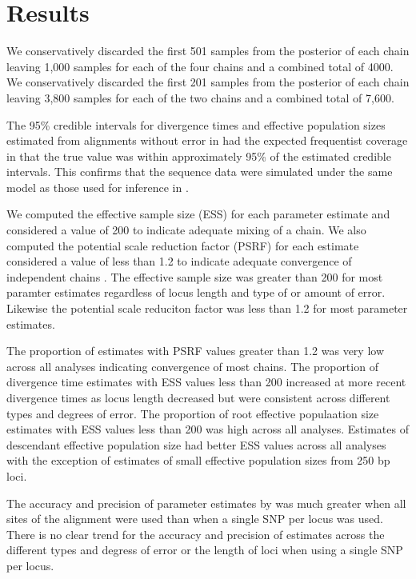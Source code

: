 \section{Results}

We conservatively discarded the first 501 samples from the posterior of each 
\ecoevolity chain leaving 1,000 samples for each of the four chains and a combined
total of 4000.
We conservatively discarded the first 201 samples from the posterior of each 
\beast chain leaving 3,800 samples for each of the two chains and a combined
total of 7,600.

The 95\% credible intervals for divergence times and effective population 
sizes estimated from alignments without error in \beast had the expected 
frequentist coverage in that the true value was within approximately 95\% of the 
estimated credible intervals. 
This confirms that the sequence data were simulated under the same model as 
those used for inference in \beast. 

We computed the effective sample size (ESS) for each parameter estimate and considered
a value of 200 to indicate adequate mixing of a chain. 
We also computed the potential scale reduction factor (PSRF) for each estimate 
considered a value of less than 1.2 to indicate adequate convergence of 
independent chains \citep{gelman1998}. 
The effective sample size was greater than 200 for most \ecoevolity paramter
estimates regardless of locus length and type of or amount of error. 
Likewise the potential scale reduciton factor was less than 1.2 for most \ecoevolity parameter estimates.

The proportion of estimates with PSRF values greater than 1.2 was very low across 
all \beast analyses indicating convergence of most chains.
The proportion of \beast divergence time estimates with ESS values less than 200 
increased at more recent divergence times as locus length decreased but were 
consistent across different types and degrees of error.
The proportion of \beast root effective populaation size estimates with ESS 
values less than 200 was high across all analyses. 
Estimates of descendant effective population size had better ESS values across all 
analyses with the exception of estimates of small effective population sizes from 
250 bp loci.

The accuracy and precision of parameter estimates by \ecoevolity was much greater
when all sites of the alignment were used than when a single SNP per locus was used.  
There is no clear trend for the accuracy and precision of \ecoevolity estimates across the
different types and degress of error or the length of loci when using a single SNP per locus. 

